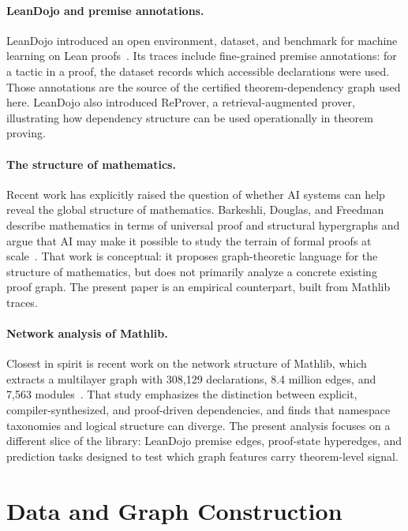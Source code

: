 \documentclass[11pt]{article}
\begin{document}
\paragraph{LeanDojo and premise annotations.}
LeanDojo introduced an open environment, dataset, and benchmark for machine
learning on Lean proofs~\cite{leandojo}. Its traces include fine-grained
premise annotations: for a tactic in a proof, the dataset records which
accessible declarations were used. Those annotations are the source of the
certified theorem-dependency graph used here. LeanDojo also introduced
ReProver, a retrieval-augmented prover, illustrating how dependency structure
can be used operationally in theorem proving.

\paragraph{The structure of mathematics.}
Recent work has explicitly raised the question of whether AI systems can help
reveal the global structure of mathematics. Barkeshli, Douglas, and Freedman
describe mathematics in terms of universal proof and structural hypergraphs and
argue that AI may make it possible to study the terrain of formal proofs at
scale~\cite{barkeshli}. That work is conceptual: it proposes graph-theoretic
language for the structure of mathematics, but does not primarily analyze a
concrete existing proof graph. The present paper is an empirical counterpart,
built from Mathlib traces.

\paragraph{Network analysis of Mathlib.}
Closest in spirit is recent work on the network structure of Mathlib, which
extracts a multilayer graph with 308,129 declarations, 8.4 million edges, and
7,563 modules~\cite{networkmathlib}. That study emphasizes the distinction
between explicit, compiler-synthesized, and proof-driven dependencies, and
finds that namespace taxonomies and logical structure can diverge. The present
analysis focuses on a different slice of the library: LeanDojo premise edges,
proof-state hyperedges, and prediction tasks designed to test which graph
features carry theorem-level signal.

\section{Data and Graph Construction}
\end{document}
